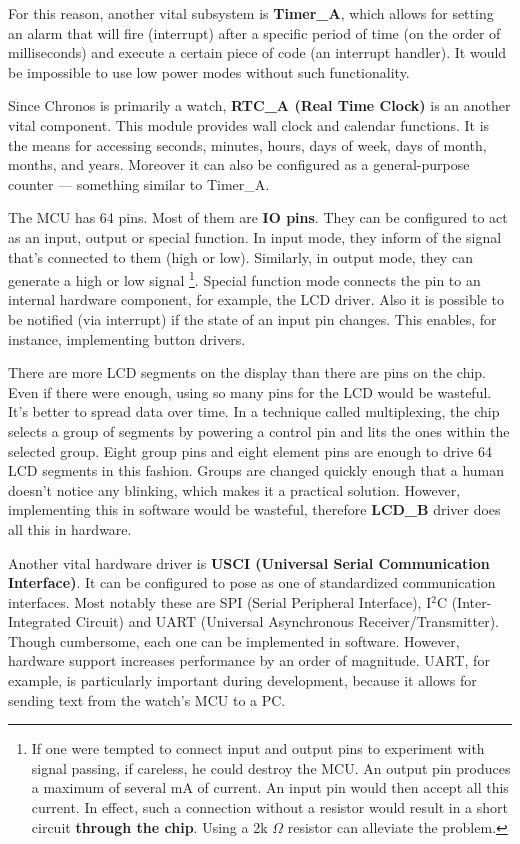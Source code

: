 For this reason, another vital subsystem is {\bf Timer\_A}, which
allows for setting an alarm that will fire (interrupt) after a specific
period of time (on the order of milliseconds) and execute a certain
piece of code (an interrupt handler). It would be impossible to use low
power modes without such functionality.

Since Chronos is primarily a watch, {\bf RTC\_A (Real Time Clock)} is
an another vital component. This module provides wall clock and
calendar functions. It is the means for accessing seconds, minutes,
hours, days of week, days of month, months, and years.  Moreover it
can also be configured as a general-purpose counter --- something
similar to Timer\_A.

The MCU has 64 pins. Most of them are {\bf IO pins}. They can be
configured to act as an input, output or special function.  In input
mode, they inform of the signal that's connected to them (high or
low). Similarly, in output mode, they can generate a high or low
signal \footnote{If one were tempted to connect input and output pins
to experiment with signal passing, if careless, he could destroy the
MCU.  An output pin produces a maximum of several mA of current. An
input pin would then accept all this current. In effect, such a
connection without a resistor would result in a short circuit {\bf
through the chip}. Using a 2k $\Omega$ resistor can alleviate the
problem.}. Special function mode connects the pin to an internal
hardware component, for example, the LCD driver.  Also it is possible
to be notified (via interrupt) if the state of an input pin changes.
This enables, for instance, implementing button drivers.

There are more LCD segments on the display than there are pins on the
chip. Even if there were enough, using so many pins for the LCD would
be wasteful. It's better to spread data over time. In a technique
called multiplexing, the chip selects a group of segments by powering
a control pin and lits the ones within the selected group. Eight group
pins and eight element pins are enough to drive 64 LCD segments in
this fashion. Groups are changed quickly enough that a human doesn't
notice any blinking, which makes it a practical solution.  However,
implementing this in software would be wasteful, therefore {\bf
LCD\_B} driver does all this in hardware.

Another vital hardware driver is {\bf USCI (Universal Serial
Communication Interface)}. It can be configured to pose as one of
standardized communication interfaces. Most notably these are SPI
(Serial Peripheral Interface), I$^2$C (Inter-Integrated Circuit) and
UART (Universal Asynchronous Receiver/Transmitter). Though cumbersome,
each one can be implemented in software. However, hardware support
increases performance by an order of magnitude. UART, for example, is
particularly important during development, because it allows for sending
text from the watch's MCU to a PC.

